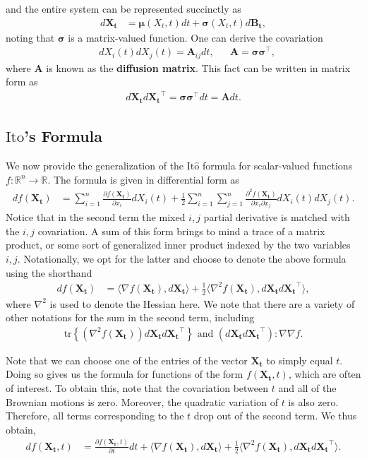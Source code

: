 \documentclass[12pt]{article}
\newcommand{\B}[1]{\boldsymbol{#1}}
\newcommand{\R}{\mathbb{R}}
\newcommand{\state}[1][t]{X_{#1}}
\newcommand{\BM}[1][t]{B_{#1}} %
\newcommand{\ito}{\text{It}\hat{\text{o}}}
\newcommand{\dimState}{n}
\newcommand{\diffMat}{\mathbf{A}} %
\begin{document}
and the entire system can be represented succinctly as
\begin{align}
d\B\state &= \B\mu(\state,t) dt + \B\sigma(\state,t) d\B\BM, \label{SDE_multidim}
\end{align}
noting that $\B\sigma$ is a matrix-valued function. One can derive the covariation 
\begin{align*}
&d\state[i](t) d\state[j](t) = \diffMat_{ij} dt, &&\diffMat = \B\sigma \B\sigma^\top, 
\end{align*}
where $\diffMat$ is known as the \textbf{diffusion matrix}. This fact can be written in matrix form as 
\begin{align*}
d\B\state d\B\state^\top = \B\sigma\B\sigma^\top dt = \diffMat dt.
\end{align*}

\subsection{$\ito$'s Formula}
We now provide the generalization of the $\ito$ formula for scalar-valued functions $f: \R^{\dimState} \to \R$. The formula is given in differential form as
\begin{align*}
df(\B\state) &= \sum_{i=1}^{\dimState} \frac{\partial f(\B\state)}{\partial x_i} d\state[i](t) + \frac{1}{2} \sum_{i=1}^{\dimState}\sum_{j=1}^{\dimState} \frac{\partial^2 f(\B\state)}{\partial x_i \partial x_j} d\state[i](t) d\state[j](t).
\end{align*}
Notice that in the second term the mixed $i,j$ partial derivative is matched with the $i,j$ covariation. A sum of this form brings to mind a trace of a matrix product, or some sort of generalized inner product indexed by the 
two variables $i,j$. Notationally, we opt for the latter and choose to denote the above formula using the shorthand 
\begin{align*}
df(\B\state) &= \langle \nabla f(\B\state), d\B\state \rangle + \frac{1}{2} \langle \nabla^2 f(\B\state), d\B\state d\B\state^\top  \rangle,
\end{align*}
where $\nabla^2$ is used to denote the Hessian here. We note that there are a variety of other notations for the sum in the second term, including 
\begin{align*}
\text{tr}\left\{(\nabla^2 f(\B\state)) d\B\state d\B\state^\top \right\} \text{ and } (d\B\state d\B\state^\top) : \nabla\nabla f.
\end{align*}

Note that we can choose one of the entries of the vector $\B\state$ to simply equal $t$. Doing so gives us the formula for functions of the form $f(\B\state, t)$, which are 
often of interest. To obtain this, note that the covariation between $t$ and all of the Brownian motions is zero. Moreover, the quadratic variation of $t$ is also zero. Therefore, 
all terms corresponding to the $t$ drop out of the second term. We thus obtain, 
\begin{align*}
df(\B\state, t) &= \frac{\partial f(\B\state,t)}{\partial t}dt  + \langle \nabla f(\B\state), d\B\state \rangle + \frac{1}{2} \langle \nabla^2 f(\B\state), d\B\state d\B\state^\top  \rangle.
\end{align*}
\end{document}
